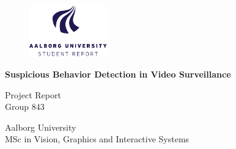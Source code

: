 
%

\begin{titlepage}

  \begin{figure}
	\raggedleft
	  \includegraphics[width=0.3\textwidth]{figures/aau_logo_en.pdf}
	\end{figure}
\addtolength{\hoffset}{0.5\evensidemargin-0.5\oddsidemargin} %
  \noindent%
	

		\vspace*{\fill} 
    \begin{center}
    \Huge{\textbf{
      Suspicious Behavior Detection in Video Surveillance%
    }}
    \end{center}
		
 \vspace{4 cm}
  \begin{center}
    {\large
      Project Report%
    }\\
    \vspace{0.2cm}
    {\Large
      Group 843%
    }
  \end{center}
  \vfill
  \begin{center}
  Aalborg University\\
  MSc in Vision, Graphics and Interactive Systems
  \end{center}
  
\end{titlepage}
\clearpage
